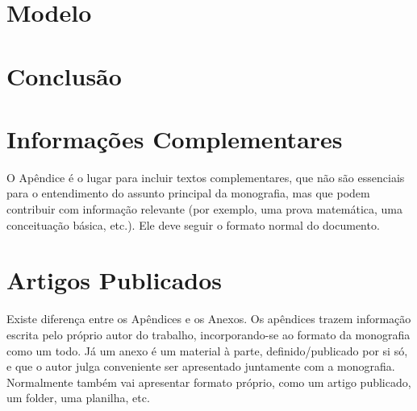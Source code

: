 \documentclass[twoside,english,brazilian]{UNISINOSmonografia}
\begin{document}
\chapter{Modelo}

\chapter{Conclusão}




\appendix
\chapter{Informações Complementares}

O Apêndice é o lugar para incluir textos complementares, que não são essenciais para o entendimento do assunto principal da monografia, mas que podem contribuir com informação relevante (por exemplo, uma prova matemática, uma conceituação básica, etc.).  Ele deve seguir o formato normal do documento.

\annex
\chapter{Artigos Publicados}
Existe diferença entre os Apêndices e os Anexos.  Os apêndices trazem informação escrita pelo próprio autor do trabalho, incorporando-se ao formato da monografia como um todo.  Já um anexo é um material à parte, definido/publicado por si só, e que o autor julga conveniente ser apresentado juntamente com a monografia.  Normalmente também vai apresentar formato próprio, como um artigo publicado, um folder, uma planilha, etc.
\end{document}
